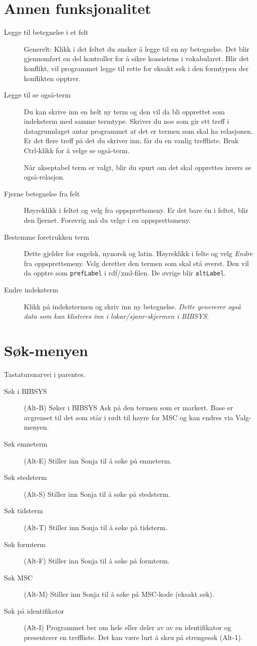 \documentclass[a4paper,norsk,11pt]{article}
\begin{document}
\section{Annen funksjonalitet}
\begin{description}
\item[Legge til betegnelse i et felt] Generelt: Klikk i det feltet du ønsker å legge til en ny betegnelse. Det blir gjennomført en del kontroller for å sikre konsistens i vokabularet. Blir det konflikt, vil programmet legge til rette for eksakt søk i den formtypen der konflikten opptrer.
\item[Legge til se også-term] Du kan skrive inn en helt ny term og den vil da bli opprettet som indeksterm med samme termtype. Skriver du noe som gir ett treff i datagrunnlaget antar programmet at det er termen som skal ha relasjonen. Er det flere treff på det du skriver inn, får du en vanlig treffliste. Bruk Ctrl-klikk for å velge se også-term.

Når akseptabel term er valgt, blir du spurt om det skal opprettes invers se også-relasjon.
\item[Fjerne betegnelse fra felt] Høyreklikk i feltet og velg fra oppsprettsmeny. Er det bare én i feltet, blir den fjernet. Forøvrig må du velge i en oppsprettsmeny.
\item[Bestemme foretrukken term] Dette gjelder for engelsk, nynorsk og latin. Høyreklikk i felte og velg \textit{Endre} fra oppsprettsmeny. Velg deretter den termen som skal stå øverst. Den vil da opptre som \texttt{prefLabel} i rdf/xml-filen. De øvrige blir \texttt{altLabel}.
\item[Endre indeksterm] Klikk på indekstermen og skriv inn ny betegnelse. \textit{Dette genererer også data som kan klisteres inn i lokar/sjanr-skjermen i BIBSYS}.
\end{description}

\section{Søk-menyen}
Tastatursnarvei i parentes.
\begin{description}
 \item[Søk i BIBSYS] (Alt-B) Søker i BIBSYS Ask på den termen som er markert. Base er avgrenset til det som står i rødt til høyre for MSC og kan endres via Valg-menyen.
 \item[Søk emneterm] (Alt-E) Stiller inn Sonja til å søke på emneterm.
 \item[Søk stedsterm] (Alt-S) Stiller inn Sonja til å søke på stedsterm.
 \item[Søk tidsterm] (Alt-T) Stiller inn Sonja til å søke på tidsterm.
 \item[Søk formterm] (Alt-F) Stiller inn Sonja til å søke på formterm.
 \item[Søk MSC] (Alt-M) Stiller inn Sonja til å søke på MSC-kode (eksakt søk).
 \item[Søk på identifikator] (Alt-I) Programmet ber om hele eller deler av av en identifikator og presenterer en treffliste. Det kan være lurt å skru på strengesøk (Alt-1).
\end{description}
\end{document}
